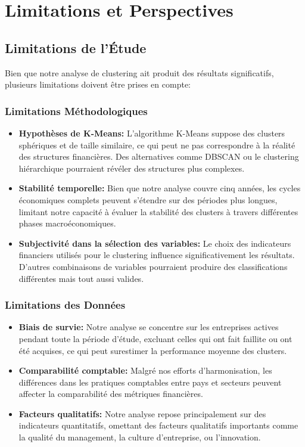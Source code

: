 \documentclass[12pt]{article}
\begin{document}
\newpage
\section{Limitations et Perspectives}
\subsection{Limitations de l'Étude}
Bien que notre analyse de clustering ait produit des résultats significatifs, plusieurs limitations doivent être prises en compte:

\subsubsection{Limitations Méthodologiques}
\begin{itemize}
    \item \textbf{Hypothèses de K-Means:} L'algorithme K-Means suppose des clusters sphériques et de taille similaire, ce qui peut ne pas correspondre à la réalité des structures financières. Des alternatives comme DBSCAN ou le clustering hiérarchique pourraient révéler des structures plus complexes.
    
    \item \textbf{Stabilité temporelle:} Bien que notre analyse couvre cinq années, les cycles économiques complets peuvent s'étendre sur des périodes plus longues, limitant notre capacité à évaluer la stabilité des clusters à travers différentes phases macroéconomiques.
    
    \item \textbf{Subjectivité dans la sélection des variables:} Le choix des indicateurs financiers utilisés pour le clustering influence significativement les résultats. D'autres combinaisons de variables pourraient produire des classifications différentes mais tout aussi valides.
\end{itemize}

\subsubsection{Limitations des Données}
\begin{itemize}
    \item \textbf{Biais de survie:} Notre analyse se concentre sur les entreprises actives pendant toute la période d'étude, excluant celles qui ont fait faillite ou ont été acquises, ce qui peut surestimer la performance moyenne des clusters.
    
    \item \textbf{Comparabilité comptable:} Malgré nos efforts d'harmonisation, les différences dans les pratiques comptables entre pays et secteurs peuvent affecter la comparabilité des métriques financières.
    
    \item \textbf{Facteurs qualitatifs:} Notre analyse repose principalement sur des indicateurs quantitatifs, omettant des facteurs qualitatifs importants comme la qualité du management, la culture d'entreprise, ou l'innovation.
\end{itemize}
\end{document}
